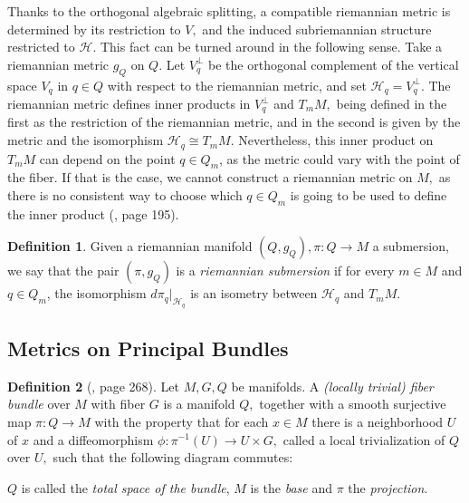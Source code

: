 \documentclass[12pt, letterpaper, reqno]{amsart}
\theoremstyle{definition}
\newtheorem{df}{Definition}
\theoremstyle{plain}
\theoremstyle{remark}
\begin{document}
Thanks to the orthogonal algebraic splitting, a compatible riemannian metric is determined by its restriction to $ V, $ and the induced subriemannian structure restricted to $ \mathcal{H} $. This fact can be turned around in the following sense. Take a riemannian metric $ g_Q $ on $ Q. $ Let $ V_q^\perp $ be the orthogonal complement of the vertical space $ V_q $ in $ q\in Q $ with respect to the riemannian metric, and set $ \mathcal{H}_q=V_q^\perp. $ The riemannian metric defines inner products in $ V_q^\perp $  and $ T_mM, $ being defined in the first as the restriction of the riemannian metric, and in the second is given by the metric and the isomorphism $ \mathcal{H}_q\cong T_mM. $ Nevertheless, this inner product on $ T_mM $ can depend on the point $ q\in Q_m $, as the metric could vary with the point of the fiber. If that is the case, we cannot construct a riemannian metric on $ M, $ as there is no consistent way to choose which $ q\in Q_m $ is going to be used to define the inner product (\cite{montgomery2002tour}, page 195).

\begin{df}
	Given a riemannian manifold $ (Q, g_Q), \pi: Q \rightarrow {M}
	$ a submersion, we say that the pair $ (\pi, g_Q) $ is a \textit{riemannian submersion} if for every $ m\in M $ and $ q\in Q_m $,  the isomorphism $ d\pi_q |_{\mathcal{H}_q} $ is an isometry between $ \mathcal{H}_q $ and $ T_m M$. 
\end{df}

\subsection{Metrics on Principal Bundles}%
\label{sub:metrics_on_principal_bundles}

\begin{df}[\cite{lee2003introduction}, page 268]
	Let $ M, G, Q $ be manifolds. A \textit{(locally trivial) fiber bundle} over $ M $ with fiber $ G $ is a manifold $ Q, $ together with a smooth surjective map $ \pi: Q \rightarrow {M}
$ with the property that for each $ x\in M $ there is a neighborhood $ U $ of $ x $ and a diffeomorphism $ \phi:\pi^{-1}(U) \rightarrow {U\times G,}
 $ called a local trivialization of $ Q $ over $ U, $ such that the following diagram commutes:
 \begin{center}
 \end{center}
 $ Q $ is called the \textit{total space of the bundle}, $ M $ is the \textit{base} and $ \pi $ the \textit{projection}.   
\end{df}
\end{document}
